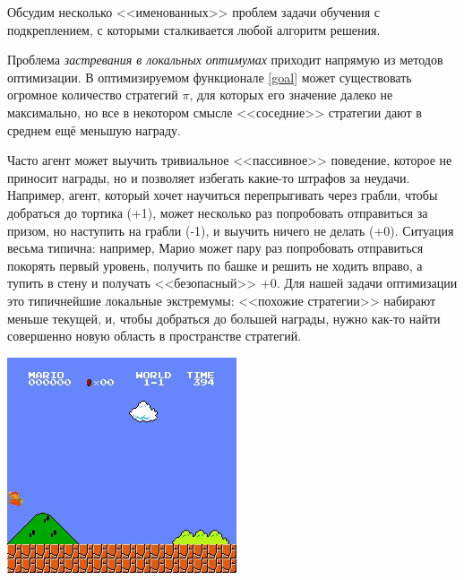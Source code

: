 Обсудим несколько <<именованных>> проблем задачи обучения с подкреплением, с которыми сталкивается любой алгоритм решения.

Проблема \emph{застревания в локальных оптимумах} приходит напрямую из методов оптимизации. В оптимизируемом функционале \eqref{goal} может существовать огромное количество стратегий $\pi$, для которых его значение далеко не максимально, но все в некотором смысле <<соседние>> стратегии дают в среднем ещё меньшую награду.

\begin{exampleBox}[righthand ratio=0.25, sidebyside, sidebyside align=center, lower separated=false]{}
Часто агент может выучить тривиальное <<пассивное>> поведение, которое не приносит награды, но и позволяет избегать какие-то штрафов за неудачи. Например, агент, который хочет научиться перепрыгивать через грабли, чтобы добраться до тортика (+1), может несколько раз попробовать отправиться за призом, но наступить на грабли (-1), и выучить ничего не делать (+0). Ситуация весьма типична: например, Марио может пару раз попробовать отправиться покорять первый уровень, получить по башке и решить не ходить вправо, а тупить в стену и получать <<безопасный>> +0. Для нашей задачи оптимизации это типичнейшие локальные экстремумы: <<похожие стратегии>> набирают меньше текущей, и, чтобы добраться до большей награды, нужно как-то найти совершенно новую область в пространстве стратегий.

\tcblower
\includegraphics[width=\textwidth]{Images/MarioStupid.png}
\end{exampleBox}

